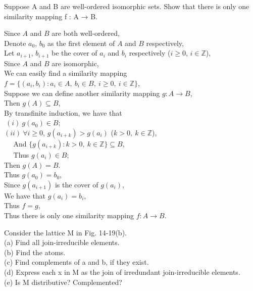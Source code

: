 \documentclass[11pt, a4paper, UTF8]{ctexart}
\begin{document}
\begin{problem}[SM: 14.62]
  Suppose A and B are well-ordered isomorphic sets. Show that there is only one similarity mapping f : A → B.
\end{problem}

\begin{solution}
  Since $A$ and $B$ are both well-ordered,\\
  Denote $a_{0}$, $b_{0}$ as the first element of $A$ and $B$ respectively,\\
  Let $a_{i+1}$, $b_{i+1}$ be the cover of $a_{i}$ and $b_{i}$ respectively
  ($i \geq 0$, $i \in \mathbb{Z}$),\\
  Since $A$ and $B$ are isomorphic,\\
  We can easily find a similarity mapping $f = \{ (a_{i},b_{i}): a_{i} \in A,~b_{i} \in B,
  ~i \geq 0,~i \in \mathbb{Z} \}$,\\
  Suppose we can define another similarity mapping $g: A \rightarrow B$,\\
  Then $g(A) \subseteq B$,\\
  By transfinite induction, we have that\\
  $~(i)~g(a_{0}) \in B$;\\
  $(ii)~\forall i \geq 0$, $g(a_{i+k}) > g(a_{i})$ ($k > 0,~k \in \mathbb{Z}$),\\
  $~~~~~~$And $\{ g(a_{i+k}): k > 0,~k \in \mathbb{Z} \} \subseteq B$,\\
  $~~~~~~$Thus $g(a_{i}) \in B$;\\
  Then $g(A) = B$.\\
  Thus $g(a_{0}) = b_{0}$,\\
  Since $g(a_{i+1})$ is the cover of $g(a_{i})$,\\
  We have that $g(a_{i}) = b_{i}$,\\
  Thus $f = g$,\\
  Thus there is only one similarity mapping $f: A \rightarrow B$.
\end{solution}

\begin{problem}[SM: 14.66]
  Consider the lattice M in Fig. 14-19(b).\\
(a) Find all join-irreducible elements.\\
(b) Find the atoms.\\
(c) Find complements of a and b, if they exist.\\
(d) Express each x in M as the join of irredundant join-irreducible elements.\\
(e) Is M distributive? Complemented?
\end{problem}
\end{document}
